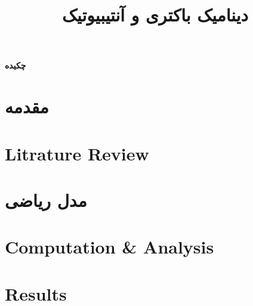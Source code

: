 \documentclass[12pt]{article}
\title{دینامیک باکتری و آنتیبیوتیک}
\date{}
\theoremstyle{definition}
\begin{document}
	

	\newpage
	\setcounter{page}{2}

	\begin{center}
		\textbf{چکیده}
	\end{center}

	\begin{flushleft}
		\Large 
		

	\end{flushleft}
	
	\newpage	
	

	\section{مقدمه} 

	\section{Litrature Review}


	\section{مدل ریاضی} 

	\section{Computation \& Analysis}

	\section{Results}

	
	
	

	
\end{document}
